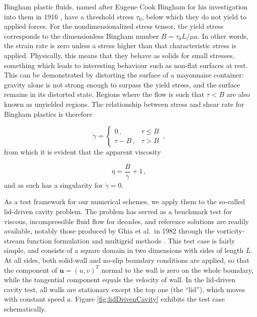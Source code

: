 \documentclass[final,3p,twocolumn]{elsarticle}
\begin{document}
Bingham plastic fluids, named after Eugene Cook Bingham for his investigation
into them in 1916 \cite{bingham1916investigation}, have a threshold stress
$\tau_0$, below which they do not yield to applied forces. For the
nondimensionalized stress tensor, the yield stress corresponds to the
dimensionless Bingham number $B = \tau_0 L/\mu a$. In other words, the strain
rate is zero unless a stress higher than that characteristic stress is applied.
Physically, this means that they behave as solids for small stresses, something
which leads to interesting behaviour such as non-flat surfaces at rest. This
can be demonstrated by distorting the surface of a mayonnaise container:
gravity alone is not strong enough to surpass the yield stress, and the surface
remains in its distorted state.  Regions where the flow is such that $\tau < B$
are also known as unyielded regions. The relationship between stress and shear
rate for Bingham plastics is therefore

\begin{equation}
    \dot{\gamma} = \begin{cases}
        0 \,,& \tau \leq B \\ 
        \tau - B \,,& \tau > B \end{cases} \,,
    \label{eq:bingham}
\end{equation}
%
from which it is evident that the apparent viscosity 

\begin{equation}
    \eta = \frac{B}{\dot{\gamma}} + 1 \,,
    \label{eq:binghamViscosity}
\end{equation}
%
and as such has a singularity for $\dot{\gamma}=0$. 

As a test framework for our numerical schemes, we apply them to the so-called
lid-driven cavity problem. The problem has served as a benchmark test for
viscous, incompressible fluid flow for decades, and reference solutions are
readily available, notably those produced by Ghia et al.\ in 1982
through the vorticity-stream function formulation and multigrid methods
\cite{ghia1982high}. This test case is fairly simple, and consists of a square
domain in two dimensions with sides of length $L$. At all sides, both solid-wall and
no-slip boundary conditions are applied, so that the component of $\bm{u} =
(u,v)^T$ normal to the wall is zero on the whole boundary, while the tangential
component equals the velocity of wall. In the lid-driven cavity test, all walls
are stationary except the top one (the ``lid''), which moves with constant
speed $a$. Figure \ref{fig:lidDrivenCavity} exhibits the test case
schematically. 
\end{document}
